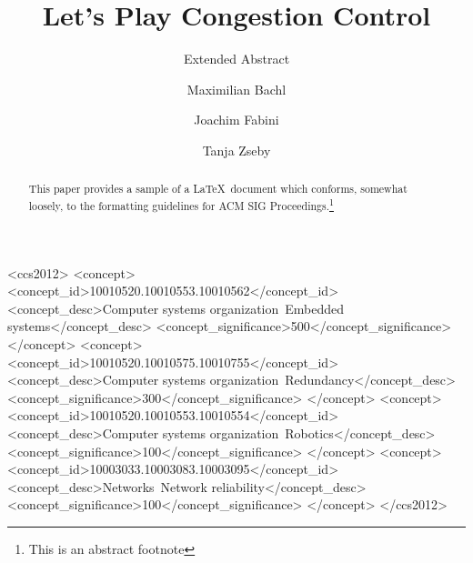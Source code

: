 \documentclass[sigconf]{acmart}
\begin{document}
\title{Let's Play Congestion Control}
\subtitle{Extended Abstract}

\author{Maximilian Bachl} 

\author{Joachim Fabini} 

\author{Tanja Zseby} 

\renewcommand{\shortauthors}{Bachl et al.}


\begin{abstract}
This paper provides a sample of a \LaTeX\ document which conforms,
somewhat loosely, to the formatting guidelines for
ACM SIG Proceedings.\footnote{This is an abstract footnote}
\end{abstract}

%
%
\begin{CCSXML}
<ccs2012>
 <concept>
  <concept_id>10010520.10010553.10010562</concept_id>
  <concept_desc>Computer systems organization~Embedded systems</concept_desc>
  <concept_significance>500</concept_significance>
 </concept>
 <concept>
  <concept_id>10010520.10010575.10010755</concept_id>
  <concept_desc>Computer systems organization~Redundancy</concept_desc>
  <concept_significance>300</concept_significance>
 </concept>
 <concept>
  <concept_id>10010520.10010553.10010554</concept_id>
  <concept_desc>Computer systems organization~Robotics</concept_desc>
  <concept_significance>100</concept_significance>
 </concept>
 <concept>
  <concept_id>10003033.10003083.10003095</concept_id>
  <concept_desc>Networks~Network reliability</concept_desc>
  <concept_significance>100</concept_significance>
 </concept>
</ccs2012>  
\end{CCSXML}
\end{document}
